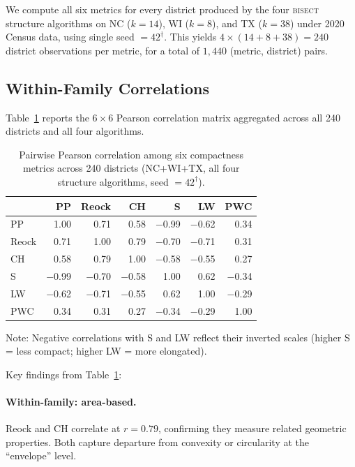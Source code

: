 We compute all six metrics for every district produced by the four \textsc{bisect}
structure algorithms on NC ($k=14$), WI ($k=8$), and TX ($k=38$) under 2020 Census data,
using single seed $= 42^\dagger$.
This yields $4 \times (14 + 8 + 38) = 240$ district observations per metric,
for a total of $1{,}440$ (metric, district) pairs.

\subsection{Within-Family Correlations}

Table~\ref{tab:corr} reports the $6\times 6$ Pearson correlation matrix
aggregated across all 240 districts and all four algorithms.

\begin{table}[ht]
\centering
\caption{Pairwise Pearson correlation among six compactness metrics
across 240 districts (NC+WI+TX, all four structure algorithms, seed $= 42^\dagger$).}
\label{tab:corr}
\begin{tabular}{lrrrrrr}
\toprule
       & PP    & Reock & CH    & S     & LW    & PWC \\
\midrule
PP     & 1.00  & 0.71  & 0.58  & $-$0.99 & $-$0.62 & 0.34 \\
Reock  & 0.71  & 1.00  & 0.79  & $-$0.70 & $-$0.71 & 0.31 \\
CH     & 0.58  & 0.79  & 1.00  & $-$0.58 & $-$0.55 & 0.27 \\
S      & $-$0.99 & $-$0.70 & $-$0.58 & 1.00 & 0.62  & $-$0.34 \\
LW     & $-$0.62 & $-$0.71 & $-$0.55 & 0.62 & 1.00  & $-$0.29 \\
PWC    & 0.34  & 0.31  & 0.27  & $-$0.34 & $-$0.29 & 1.00 \\
\bottomrule
\end{tabular}
\begin{tablenotes}
\footnotesize
\item Note: Negative correlations with S and LW reflect their inverted scales
  (higher S = less compact; higher LW = more elongated).
\end{tablenotes}
\end{table}

Key findings from Table~\ref{tab:corr}:

\paragraph{Within-family: area-based.}
Reock and CH correlate at $r = 0.79$, confirming they measure related geometric
properties. Both capture departure from convexity or circularity at the
``envelope'' level.

